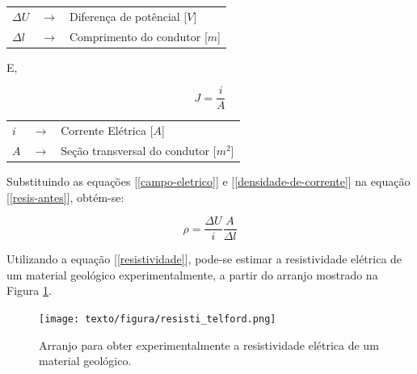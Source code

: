         {\footnotesize \noindent
            \begin{table}[H]
                \begin{tabular*}{5cm}{p{0.4cm}p{0.1cm}p{10cm}}
                    {\footnotesize $\Delta U$}  & {\footnotesize $\rightarrow$} & {\footnotesize Diferença de potêncial [$V$] }\\
                    {\footnotesize $\Delta l$}         & {\footnotesize $\rightarrow$} & {\footnotesize Comprimento do condutor [$m$]}\\
                \end{tabular*}
            \end{table}}
            
        \noindent E,
        
        \begin{equation}
            \label{densidade-de-corrente}
            J = \frac{i}{A}
        \end{equation}
        
        {\footnotesize \noindent
            \begin{table}[H]
                \begin{tabular*}{1cm}{p{0.05cm}p{0.1cm}p{10cm}}
                    {\footnotesize $i$}  & {\footnotesize $\rightarrow$} & {\footnotesize Corrente Elétrica [$A$] }\\
                    {\footnotesize $A$}  & {\footnotesize $\rightarrow$} & {\footnotesize Seção transversal do condutor [$m^2$]}\\
                \end{tabular*}
            \end{table}}

        \noindent Substituindo as equações [\ref{campo-eletrico}] e [\ref{densidade-de-corrente}] na equação [\ref{resis-antes}], obtém-se:
        
        \begin{equation}
            \label{resistividade}
            \rho = \dfrac{\Delta U}{i} \dfrac{A}{\Delta l}
        \end{equation}

        Utilizando a equação [\ref{resistividade}], pode-se estimar a resistividade elétrica de um material geológico experimentalmente, a partir do arranjo mostrado na Figura \ref{arranjo-resistividade}.

        \begin{figure}[H]
            \caption[Arranjo para obter a resistividade elétrica]{Arranjo para obter experimentalmente a resistividade elétrica de um material geológico.}
                \begin{center}
                    \texttt{[image: texto/figura/resisti\_telford.png]}
                \end{center}
            \label{arranjo-resistividade}
        \end{figure}
        
